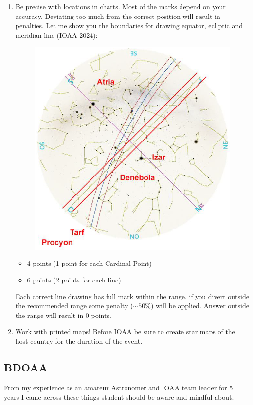\documentclass[a4paper,12pt]{extarticle}
\begin{document}
\begin{enumerate}
	\item \textsf{Be precise with locations in charts.} Most of the marks depend on your accuracy. Deviating too much from the correct position will result in penalties. Let me show you the boundaries for drawing equator, ecliptic and meridian line (IOAA 2024):  
\begin{figure}[H]
	\centering
	\includegraphics[width=0.8\linewidth]{boundari_map.png}
\end{figure}
\begin{sol}
\begin{itemize}
	\itemsep0em 
	\item 4 points (1 point for each Cardinal Point)
	\item 6 points (2 points for each line)
\end{itemize}
\end{sol}
{\color{red} Each correct line drawing has full mark within the range, if you divert outside the recommended range some penalty ($\sim 50\%$) will be applied. Answer outside the range will result in 0 points.} 
\item \textsf{Work with printed maps!} Before IOAA be sure to create star maps of the host country for the duration of the event.
\end{enumerate}



\clearpage
\subsection{BDOAA}
From my experience as an amateur Astronomer and IOAA team leader for 5 years I came across these things student should be aware and mindful about. 
\end{document}
